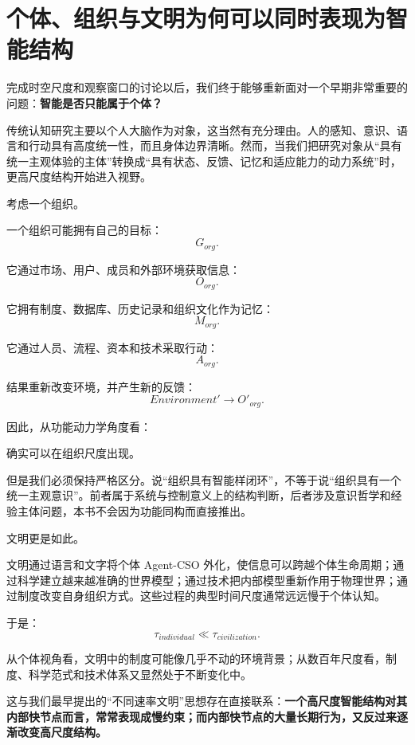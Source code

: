 \section{个体、组织与文明为何可以同时表现为智能结构}

完成时空尺度和观察窗口的讨论以后，我们终于能够重新面对一个早期非常重要的问题：\textbf{智能是否只能属于个体？}

传统认知研究主要以个人大脑作为对象，这当然有充分理由。人的感知、意识、语言和行动具有高度统一性，而且身体边界清晰。然而，当我们把研究对象从“具有统一主观体验的主体”转换成“具有状态、反馈、记忆和适应能力的动力系统”时，更高尺度结构开始进入视野。

考虑一个组织。

一个组织可能拥有自己的目标：
\[
G_{org}.
\]

它通过市场、用户、成员和外部环境获取信息：
\[
O_{org}.
\]

它拥有制度、数据库、历史记录和组织文化作为记忆：
\[
M_{org}.
\]

它通过人员、流程、资本和技术采取行动：
\[
A_{org}.
\]

结果重新改变环境，并产生新的反馈：
\[
Environment'
\rightarrow O'_{org}.
\]

因此，从功能动力学角度看：
\begin{statementbox}
\centering
{}
\end{statementbox}
确实可以在组织尺度出现。

但是我们必须保持严格区分。说“组织具有智能样闭环”，不等于说“组织具有一个统一主观意识”。前者属于系统与控制意义上的结构判断，后者涉及意识哲学和经验主体问题，本书不会因为功能同构而直接推出。

文明更是如此。

文明通过语言和文字将个体 Agent-CSO 外化，使信息可以跨越个体生命周期；通过科学建立越来越准确的世界模型；通过技术把内部模型重新作用于物理世界；通过制度改变自身组织方式。这些过程的典型时间尺度通常远远慢于个体认知。

于是：
\[
\tau_{individual}
\ll
\tau_{civilization}.
\]

从个体视角看，文明中的制度可能像几乎不动的环境背景；从数百年尺度看，制度、科学范式和技术体系又显然处于不断变化中。

这与我们最早提出的“不同速率文明”思想存在直接联系：\textbf{一个高尺度智能结构对其内部快节点而言，常常表现成慢约束；而内部快节点的大量长期行为，又反过来逐渐改变高尺度结构。}


